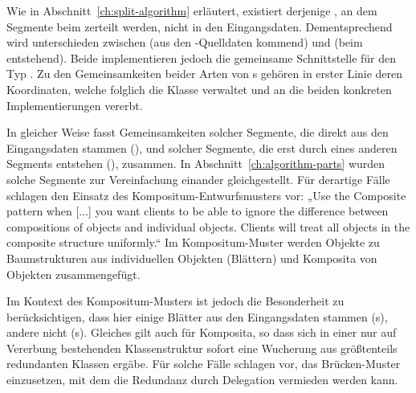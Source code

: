 \documentclass[../main/thesis.tex]{subfiles}
\begin{document}
Wie in Abschnitt~\ref{ch:split-algorithm} erläutert, existiert derjenige , an dem Segmente beim  zerteilt werden, nicht in den Eingangsdaten.
Dementsprechend wird unterschieden zwischen  (aus den \osm-Quelldaten kommend) und  (beim  entstehend).
Beide implementieren jedoch die gemeinsame Schnittstelle für den Typ .
Zu den Gemeinsamkeiten beider Arten von s gehören in erster Linie deren Koordinaten, welche folglich die Klasse  verwaltet und an die beiden konkreten Implementierungen vererbt.

In gleicher Weise fasst  Gemeinsamkeiten solcher Segmente, die direkt aus den Eingangsdaten stammen (), und solcher Segmente, die erst durch  eines anderen Segments entstehen (), zusammen.
In Abschnitt~\ref{ch:algorithm-parts} wurden solche Segmente zur Vereinfachung einander gleichgestellt.
Für derartige Fälle schlagen \citeauthor{GHJV95} den Einsatz des Kompositum-Entwurfsmusters vor:
„Use the Composite pattern when [...] you want clients to be able to ignore the difference between compositions of objects and individual objects. Clients will treat all objects in the composite structure uniformly.“ 
Im Kompositum-Muster werden Objekte zu Baumstrukturen aus individuellen Objekten (Blättern) und Komposita von Objekten zusammengefügt.

Im Kontext des Kompositum-Musters ist jedoch die Besonderheit zu berücksichtigen, dass hier einige Blätter aus den Eingangsdaten stammen (s), andere nicht (s).
Gleiches gilt auch für Komposita, so dass sich in einer nur auf Vererbung bestehenden Klassenstruktur sofort eine Wucherung aus größtenteils redundanten Klassen ergäbe.
Für solche Fälle schlagen \citeauthor{GHJV95} vor, das Brücken-Muster  einzusetzen, mit dem die Redundanz durch Delegation vermieden werden kann. 

\end{document}
